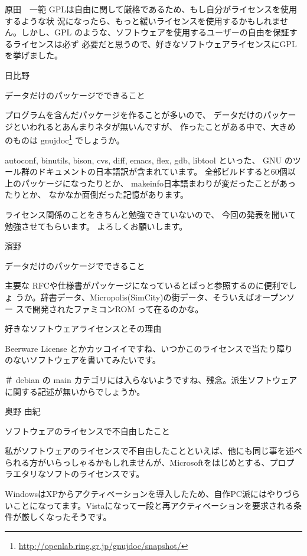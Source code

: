 \documentclass[cjk,dvipdfmx,12pt]{beamer}
\begin{document}
\begin{frame}{原田　一範}
GPLは自由に関して厳格であるため、もし自分がライセンスを使用するような状
況になったら、もっと緩いライセンスを使用するかもしれません。しかし、GPL
のような、ソフトウェアを使用するユーザーの自由を保証するライセンスは必ず
必要だと思うので、好きなソフトウェアライセンスにGPLを挙げました。

\end{frame}\begin{frame}{日比野}

データだけのパッケージでできること

プログラムを含んだパッケージを作ることが多いので、
データだけのパッケージといわれるとあんまりネタが無いんですが、
作ったことがある中で、大きめのものは 
gnujdoc\footnote{\url{http://openlab.ring.gr.jp/gnujdoc/snapshot/}} でしょうか。

autoconf, binutils, bison, cvs, diff, emacs, flex, gdb, libtool といった、
GNU のツール群のドキュメントの日本語訳が含まれています。
全部ビルドすると60個以上のパッケージになったりとか、
makeinfo日本語まわりが変だったことがあったりとか、
なかなか面倒だった記憶があります。

ライセンス関係のことをきちんと勉強できていないので、
今回の発表を聞いて勉強させてもらいます。
よろしくお願いします。

\end{frame}\begin{frame}{濱野}

データだけのパッケージでできること

主要な RFCや仕様書がパッケージになっているとぱっと参照するのに便利でしょ
うか。辞書データ、Micropolis(SimCity)の街データ、そういえばオープンソー
スで開発されたファミコンROM って在るのかな。

好きなソフトウェアライセンスとその理由

Beerware License とかカッコイイですね、いつかこのライセンスで当たり障り
のないソフトウェアを書いてみたいです。

＃ debian の main カテゴリには入らないようですね、残念。派生ソフトウェア
に関する記述が無いからでしょうか。


\end{frame}\begin{frame}{奥野 由紀}

ソフトウェアのライセンスで不自由したこと

私がソフトウェアのライセンスで不自由したことといえば、他にも同じ事を述べられる方がいらっしゃるかもしれませんが、Microsoftをはじめとする、プロプラエタリなソフトのライセンスです。

WindowsはXPからアクティベーションを導入したため、自作PC派にはやりづらいことになってます。Vistaになって一段と再アクティベーションを要求される条件が厳しくなったそうです。


\end{frame}
\end{document}
